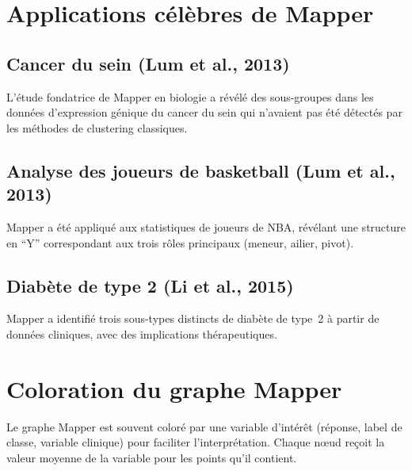 \section{Applications c\'el\`ebres de Mapper}

\subsection{Cancer du sein (Lum et al., 2013)}

L'\'etude fondatrice de Mapper en biologie a r\'ev\'el\'e des
sous-groupes dans les donn\'ees d'expression g\'enique du cancer du
sein qui n'avaient pas \'et\'e d\'etect\'es par les m\'ethodes de
clustering classiques.

\subsection{Analyse des joueurs de basketball (Lum et al., 2013)}

Mapper a \'et\'e appliqu\'e aux statistiques de joueurs de NBA,
r\'ev\'elant une structure en ``Y'' correspondant aux trois r\^oles
principaux (meneur, ailier, pivot).

\subsection{Diabète de type 2 (Li et al., 2015)}

Mapper a identifi\'e trois sous-types distincts de diab\`ete de type~2
\`a partir de donn\'ees cliniques, avec des implications th\'erapeutiques.

\section{Coloration du graphe Mapper}

\begin{remarque}
Le graphe Mapper est souvent color\'e par une variable d'int\'er\^et
(r\'eponse, label de classe, variable clinique) pour faciliter
l'interpr\'etation. Chaque n\oe{}ud re\c{c}oit la valeur moyenne de
la variable pour les points qu'il contient.
\end{remarque}

